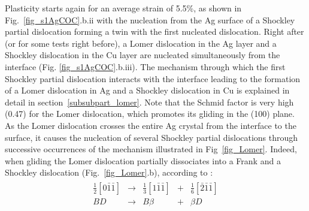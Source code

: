 \documentclass[final,3p,times,twocolumn]{elsarticle}
\begin{document}
Plasticity starts again for an average strain of 5.5\%, as shown in Fig.~\ref{fig_s1AgCOC}.b.ii with the nucleation from the Ag surface of a Shockley partial dislocation forming a twin with the first nucleated dislocation. Right after (or for some tests right before), a Lomer dislocation in the Ag layer and a Shockley dislocation in the Cu layer are nucleated simultaneously from the interface (Fig. \ref{fig_s1AgCOC}.b.iii). The mechanism through which the first Shockley partial dislocation interacts with the interface leading to the formation of a Lomer dislocation in Ag and a Shockley dislocation in Cu is explained in detail in section~\ref{subsubpart_lomer}. 
Note that the Schmid factor is very high (0.47) for the Lomer dislocation, which promotes its gliding in the (100) plane.
As the Lomer dislocation crosses the entire Ag crystal from the interface to the surface, it causes the nucleation of several Shockley partial dislocations through successive occurrences of the mechanism illustrated in Fig~\ref{fig_Lomer}. Indeed, when gliding the Lomer dislocation partially dissociates into a Frank and a Shockley dislocation (Fig.~\ref{fig_Lomer}.b), according to \cite{wu09AM}:
\begin{eqnarray}\label{1}
	\begin{array}{ccccc}
\frac{1}{2}\left[0\bar{1}\bar{1}\right] &\rightarrow &  \frac{1}{3}\left[1\bar{1}\bar{1}\right]&+& \frac{1}{6}\left[\bar{2}\bar{1}\bar{1}\right] \\
BD &\rightarrow &  B\beta &+& \beta D\\
	\end{array}
\end{eqnarray} 
\end{document}
